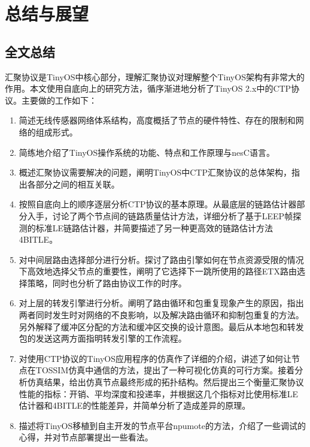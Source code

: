 ﻿%
%
%

\renewcommand{\baselinestretch}{1.5}
\fontsize{12pt}{13pt}\selectfont

\chapter{总结与展望}\label{conclusion}
\section{全文总结}
汇聚协议是TinyOS中核心部分，理解汇聚协议对理解整个TinyOS架构有非常大的作用。本文使用自底向上的研究方法，循序渐进地分析了TinyOS 2.x中的CTP协议。主要做的工作如下：
\vspace{-10pt}
\begin{enumerate}
	\item 简述无线传感器网络体系结构，高度概括了节点的硬件特性、存在的限制和网络的组成形式。
	\item 简练地介绍了TinyOS操作系统的功能、特点和工作原理与nesC语言。
	\item 概述汇聚协议需要解决的问题，阐明TinyOS中CTP汇聚协议的总体架构，指出各部分之间的相互关联。
	\item 按照自底向上的顺序逐层分析CTP协议的基本原理。从最底层的链路估计器部分入手，讨论了两个节点间的链路质量估计方法，详细分析了基于LEEP帧探测的标准LE链路估计器，并简要描述了另一种更高效的链路估计方法4BITLE。
	\item 对中间层路由选择部分进行分析。探讨了路由引擎如何在节点资源受限的情况下高效地选择父节点的重要性，阐明了它选择下一跳所使用的路径ETX路由选择策略，同时也分析了路由协议工作的时序。
	\item 对上层的转发引擎进行分析。阐明了路由循环和包重复现象产生的原因，指出两者同时发生时对网络的不良影响，以及解决路由循环和抑制包重复的方法。另外解释了缓冲区分配的方法和缓冲区交换的设计意图。最后从本地包和转发包的发送这两方面指明转发引擎的工作流程。
	\item 对使用CTP协议的TinyOS应用程序的仿真作了详细的介绍，讲述了如何让节点在TOSSIM仿真中通信的方法，提出了一种可视化仿真的可行方案。接着分析仿真结果，给出仿真节点最终形成的拓扑结构。然后提出三个衡量汇聚协议性能的指标：开销、平均深度和投递率，并根据这几个指标对比使用标准LE估计器和4BITLE的性能差异，并简单分析了造成差异的原理。
	\item 描述将TinyOS移植到自主开发的节点平台npumote的方法，介绍了一些调试的心得，并对节点部署提出一些看法。
\end{enumerate}


